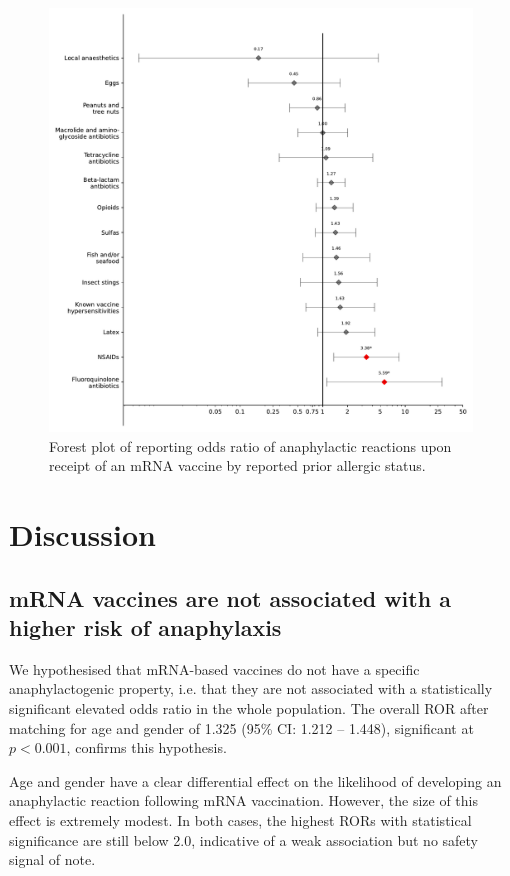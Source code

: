 \documentclass{article}
\begin{document}
\begin{figure}
\centering
\includegraphics[width=12.5 cm]{forest_plot_of_anaphylaxis_by_known_allergies}
\caption{Forest plot of reporting odds ratio of anaphylactic reactions upon receipt of an mRNA vaccine by reported prior allergic status.}
\label{fig:allergies-forest-plot}
\end{figure}


\section{Discussion}

\subsection{mRNA vaccines are not associated with a higher risk of anaphylaxis}

We hypothesised that mRNA-based vaccines do not have a specific anaphylactogenic property, i.e. that they are not associated with a statistically significant elevated odds ratio in the whole population.
The overall ROR after matching for age and gender of 1.325 (95\% CI: 1.212 -- 1.448), significant at $p<0.001$, confirms this hypothesis.

Age and gender have a clear differential effect on the likelihood of developing an anaphylactic reaction following mRNA vaccination.
However, the size of this effect is extremely modest.
In both cases, the highest RORs with statistical significance are still below 2.0, indicative of a weak association but no safety signal of note.
\end{document}
